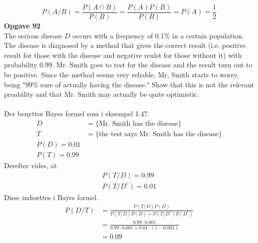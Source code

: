 \documentclass[12pt,a4paper,draft]{report}
\begin{document}
\begin{equation}
P(A/B)=\frac{P(A\cap B)}{P(B)}=\frac{P(A)P(B)}{P(B)}=P(A)=\frac{1}{2}
\end{equation}
\textbf{Opgave 92}\\
The serious disease $D$ occurs with a frequency of 0.1\% in a certain population. The disease is diagnosed by a method that gives the correct result (i.e. positive result for those with the disease and negative reulst for those without it) with probability 0.99. Mr. Smith goes to test for the disease and the result turn out to be positive. Since the method seems very reliable, Mr. Smith starts to worry, being "99\% sure of actually having the disease." Show that this is not the relevant proability and that Mr. Smith may actually be quite optimistic.\\\\
Der benyttes Bayes formel som i eksempel 1.47.
\begin{align*}
D&=\{\text{Mr. Smith has the disease}\}\\
T&=\{\text{the test says Mr. Smith has the disease}\}\\
P(D)=0.01\\
P(T)=0.99
\end{align*}
Derefter vides, at
\begin{align*}
P(T/D)=0.99\\
P(T/D^c)=0.01
\end{align*}
Disse indsættes i Bayes formel.
\begin{align*}
P(D/T)&=
\frac{P(T/D)P(D)}{P(T/D)P(D)+P(T/D^c)P(D^c)}\\
&=\frac{0.99\cdot 0.001}{0.99\cdot 0.001+0.01\cdot(1-0.001)}\\
&=0.09
\end{align*}
\end{document}
